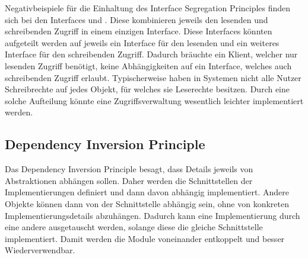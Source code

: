 Negativbeispiele für die Einhaltung des Interface Segregation Principles finden sich bei den Interfaces \href{https://github.com/anditru/quickie/blob/bb41442c7f1ffbfcd3117cd86a40f7932e543a33/3-quickie-domain/src/main/java/org/pinkcrazyunicorn/quickie/domain/profile/ProfileRepository.java}{} und \href{https://github.com/anditru/quickie/blob/bb41442c7f1ffbfcd3117cd86a40f7932e543a33/3-quickie-domain/src/main/java/org/pinkcrazyunicorn/quickie/domain/recipe/RecipeRepository.java}{}. Diese kombinieren jeweils den lesenden und schreibenden Zugriff in einem einzigen Interface. Diese Interfaces könnten aufgeteilt werden auf jeweils ein Interface für den lesenden und ein weiteres Interface für den schreibenden Zugriff. Dadurch bräuchte ein Klient, welcher nur lesenden Zugriff benötigt, keine Abhängigkeiten auf ein Interface, welches auch schreibenden Zugriff erlaubt. Typischerweise haben in Systemen nicht alle Nutzer Schreibrechte auf jedes Objekt, für welches sie Leserechte besitzen. Durch eine solche Aufteilung könnte eine Zugriffsverwaltung wesentlich leichter implementiert werden. 

\subsection{Dependency Inversion Principle}
Das Dependency Inversion Principle besagt, dass Details jeweils von Abstraktionen abhängen sollen. Daher werden die Schnittstellen der Implementierungen definiert und dann davon abhängig implementiert. Andere Objekte können dann von der Schnittstelle abhängig sein, ohne von konkreten Implementierungsdetails abzuhängen. Dadurch kann eine Implementierung durch eine andere ausgetauscht werden, solange diese die gleiche Schnittstelle implementiert. Damit werden die Module voneinander entkoppelt und besser Wiederverwendbar.

